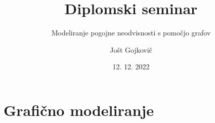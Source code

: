 \documentclass{beamer}
\title{Diplomski seminar}
\subtitle{Modeliranje pogojne neodvisnosti s pomočjo grafov}
\author{Jošt Gojkovič}
\institute[FMF] {Fakulteta za matematiko in fiziko}
\date{12. 12. 2022}
\begin{document}
\begin{frame}
    \titlepage         %
  \end{frame}
  

\section{Grafično modeliranje}

\begin{frame}

   
\end{frame}
\end{document}
